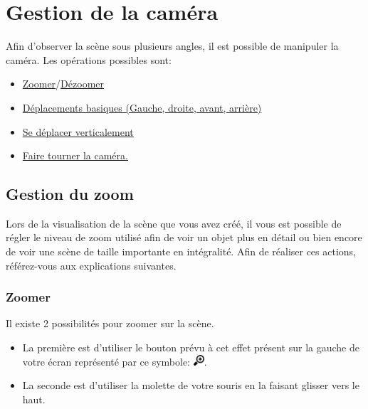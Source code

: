 \documentclass[11pt]{report}
\begin{document}
\chapter{Gestion de la caméra}


Afin d'observer la scène sous plusieurs angles, il est possible de manipuler la caméra. Les opérations possibles sont:
\begin{itemize}
        \item \hyperlink{zoom}{Zoomer}/\hyperlink{dezoom}{Dézoomer}
        \item \hyperlink{move}{Déplacements basiques (Gauche, droite, avant, arrière)}
        \item \hyperlink{moveV}{Se déplacer verticalement}
        \item \hyperlink{rotate}{Faire tourner la caméra.}
\end{itemize}

\section{Gestion du zoom}

Lors de la visualisation de la scène que vous avez créé, il vous est possible de régler le niveau de zoom utilisé afin de voir un objet plus en détail ou bien encore de voir une scène de taille importante en intégralité. Afin de réaliser ces actions, référez-vous aux explications suivantes.


\subsection{Zoomer}

\hypertarget{zoom}{Il existe 2 possibilités pour zoomer sur la scène.}
\begin{itemize}
        \item La première est d'utiliser le bouton prévu à cet effet présent sur la gauche de votre écran représenté par ce symbole: \includegraphics[width=0.4cm]{./btn_zoom-in.png}.
        \item La seconde est d'utiliser la molette de votre souris en la faisant glisser vers le haut.
\end{itemize}
\end{document}
